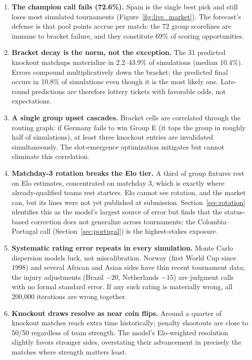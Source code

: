 \documentclass[11pt,letterpaper]{article}
\begin{document}
\begin{enumerate}
\item \textbf{The champion call fails (72.6\%).} Spain is the single best pick and still loses most simulated tournaments (Figure~\ref{fig:live_market}). The forecast's defense is that pool points accrue per match: the 72 group scorelines are immune to bracket failure, and they constitute 69\% of scoring opportunities.
\item \textbf{Bracket decay is the norm, not the exception.} The 31 predicted knockout matchups materialize in 2.2--43.9\% of simulations (median 10.4\%). Errors compound multiplicatively down the bracket; the predicted final occurs in 10.8\% of simulations even though it is the most likely one. Late-round predictions are therefore lottery tickets with favorable odds, not expectations.
\item \textbf{A single group upset cascades.} Bracket cells are correlated through the routing graph: if Germany fails to win Group E (it tops the group in roughly half of simulations), at least three knockout entries are invalidated simultaneously. The slot-emergence optimization mitigates but cannot eliminate this correlation.
\item \textbf{Matchday-3 rotation breaks the Elo tier.} A third of group fixtures rest on Elo estimates, concentrated on matchday 3, which is exactly where already-qualified teams rest starters. Elo cannot see rotation, and the market can, but its lines were not yet published at submission. Section~\ref{sec:rotation} identifies this as the model's largest source of error but finds that the status-based correction does not generalize across tournaments; the Colombia--Portugal call (Section~\ref{sec:portugal}) is the highest-stakes exposure.
\item \textbf{Systematic rating error repeats in every simulation.} Monte Carlo dispersion models luck, not miscalibration. Norway (first World Cup since 1998) and several African and Asian sides have thin recent tournament data; the injury adjustments (Brazil $-20$, Netherlands $-15$) are judgment calls with no formal standard error. If any such rating is materially wrong, all 200{,}000 iterations are wrong together.
\item \textbf{Knockout draws resolve as near coin flips.} Around a quarter of knockout matches reach extra time historically; penalty shootouts are close to 50/50 regardless of team strength. The model's Elo-weighted resolution slightly favors stronger sides, overstating their advancement in precisely the matches where strength matters least.
\end{enumerate}
\end{document}
